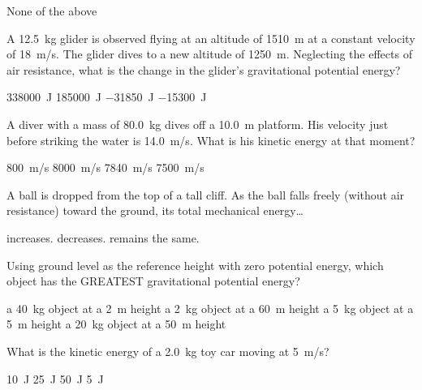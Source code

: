\documentclass[]{exam}
\begin{document}
\begin{questions}
\begin{randomizechoices}[keeplast]
    \choice None of the above
\end{randomizechoices}



\question
A \SI{12.5}{kg} glider is observed flying at an altitude of \SI{1510}{m} at a constant velocity of \SI{18}{m/s}. The glider dives to a new altitude of \SI{1250}{m}. Neglecting the effects of air resistance, what is the change in the glider's gravitational potential energy?

\begin{randomizechoices}
\choice \SI{338000}{J}
\choice \SI{185000}{J}
\correctchoice \SI{-31850}{J}
\choice \SI{-15300}{J}
\end{randomizechoices}

\question
A diver with a mass of \SI{80.0}{kg} dives off a \SI{10.0}{m} platform. His velocity just before striking the water is \SI{14.0}{m/s}. What is his kinetic energy at that moment?

\begin{randomizechoices}
\choice \SI{800}{m/s}
\choice \SI{8000}{m/s}
\correctchoice \SI{7840}{m/s}
\choice \SI{7500}{m/s}
\end{randomizechoices}

\question
A ball is dropped from the top of a tall cliff. As the ball falls freely (without air resistance) toward the ground, its total mechanical energy\ldots 

\begin{randomizechoices}
\choice increases.
\choice decreases.
\correctchoice remains the same.
\end{randomizechoices}

\question
Using ground level as the reference height with zero potential energy, which object has the GREATEST gravitational potential energy?

\begin{randomizechoices}
\choice a \SI{40}{kg} object at a \SI{2}{m} height
\choice a \SI{2}{kg} object at a \SI{60}{m} height
\choice a \SI{5}{kg} object at a \SI{5}{m} height
\correctchoice a \SI{20}{kg} object at a \SI{50}{m} height
\end{randomizechoices}

\question
What is the kinetic energy of a \SI{2.0}{kg} toy car moving at \SI{5}{m/s}?

\begin{randomizechoices}
\choice \SI{10}{J}
\correctchoice \SI{25}{J}
\choice \SI{50}{J}
\choice \SI{5}{J}
\end{randomizechoices}


\end{questions}
\end{document}
